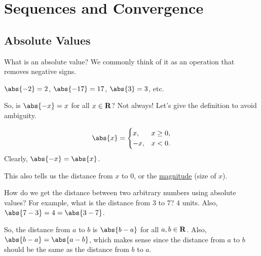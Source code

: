 \chapter{Sequences and Convergence}
\section{Absolute Values}
What is an absolute value? We commonly think of it as an operation that removes negative signs.
\begin{Example}{}{}
    $ \abs{-2}=2 $, $ \abs{-17}=17 $, $ \abs{3}=3 $, etc.
\end{Example}
So, is $ \abs{-x}=x $ for all $ x\in\mathbf{R}$? Not always! Let's give the definition to avoid ambiguity.
\begin{Definition}{}{}
    \[ \abs{x}=\begin{cases}
            x,  & x\ge 0, \\
            -x, & x<0.
        \end{cases} \]
    Clearly, $ \abs{-x}=\abs{x} $.
\end{Definition}
This also tells us the distance from $ x $ to $ 0 $, or the \underline{magnitude} (size of $ x $).
\begin{Example}{}{}
    How do we get the distance between two arbitrary numbers using absolute values? For example, what is
    the distance from $ 3 $ to $ 7 $? $ 4 $ units. Also, $ \abs{7-3}=4=\abs{3-7} $.
\end{Example}
So, the distance from $ a $ to $ b $ is $ \abs{b-a} $ for all $ a,b\in\mathbf{R} $. Also,
$ \abs{b-a}=\abs{a-b} $, which makes sense since the distance from $ a $ to $ b $ should be the same as
the distance from $ b $ to $ a $.
